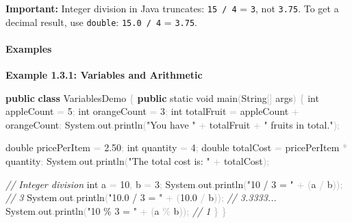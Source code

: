 \documentclass[
  justified,
  openright,
]{tufte-book}
\let\subsection\paragraph
\let\paragraph\paragraph
\newcommand{\KeywordTok}[1]{\textcolor{CodeKeyword}{\textbf{#1}}}  %
\newcommand{\StringTok}[1]{\textcolor{CodeString}{#1}}              %
\newcommand{\CommentTok}[1]{\textcolor{CodeComment}{\textit{#1}}}  %
\newcommand{\CodeNumTok}[1]{\textcolor{CodeNumber}{#1}}             %
\newcommand{\CodeFuncTok}[1]{\textcolor{CodeKeyword}{#1}}           %
\newcommand{\CodeTypeTok}[1]{\textcolor{CodeType}{#1}}              %
\newcommand{\OperatorTok}[1]{\textcolor{DarkGray}{#1}}              %
\newenvironment{Shaded}{%
  \begin{mdframed}[style=TufteCode]%
}{%
  \end{mdframed}%
}
\let\subsection\paragraph
\let\paragraph\paragraph
\begin{document}
\textbf{Important:} Integer division in Java truncates:
\texttt{15\ /\ 4} = \texttt{3}, not \texttt{3.75}. To get a decimal
result, use \texttt{double}: \texttt{15.0\ /\ 4} = \texttt{3.75}.

\subsection{Examples}\label{examples-21}

\textbf{Example 1.3.1: Variables and Arithmetic}

\begin{Shaded}
\begin{Highlighting}[]
\KeywordTok{public} \KeywordTok{class} VariablesDemo \OperatorTok{\{}
    \KeywordTok{public} \CodeTypeTok{static} \CodeTypeTok{void} \CodeFuncTok{main}\OperatorTok{(}String\OperatorTok{[]} args\OperatorTok{)} \OperatorTok{\{}
        \CodeTypeTok{int} appleCount \OperatorTok{=} \CodeNumTok{5}\OperatorTok{;}
        \CodeTypeTok{int} orangeCount \OperatorTok{=} \CodeNumTok{3}\OperatorTok{;}
        \CodeTypeTok{int} totalFruit \OperatorTok{=} appleCount \OperatorTok{+} orangeCount\OperatorTok{;}
        System\OperatorTok{.}\CodeFuncTok{out}\OperatorTok{.}\CodeFuncTok{println}\OperatorTok{(}\StringTok{"You have "} \OperatorTok{+} totalFruit \OperatorTok{+} \StringTok{" fruits in total."}\OperatorTok{);}
 
        \CodeTypeTok{double} pricePerItem \OperatorTok{=} \CodeNumTok{2.50}\OperatorTok{;}
        \CodeTypeTok{int} quantity \OperatorTok{=} \CodeNumTok{4}\OperatorTok{;}
        \CodeTypeTok{double} totalCost \OperatorTok{=} pricePerItem \OperatorTok{*} quantity\OperatorTok{;}
        System\OperatorTok{.}\CodeFuncTok{out}\OperatorTok{.}\CodeFuncTok{println}\OperatorTok{(}\StringTok{"The total cost is: "} \OperatorTok{+} totalCost\OperatorTok{);}
 
        \CommentTok{// Integer division}
        \CodeTypeTok{int} a \OperatorTok{=} \CodeNumTok{10}\OperatorTok{,} b \OperatorTok{=} \CodeNumTok{3}\OperatorTok{;}
        System\OperatorTok{.}\CodeFuncTok{out}\OperatorTok{.}\CodeFuncTok{println}\OperatorTok{(}\StringTok{"10 / 3 = "} \OperatorTok{+} \OperatorTok{(}a \OperatorTok{/} b\OperatorTok{));}       \CommentTok{// 3}
        System\OperatorTok{.}\CodeFuncTok{out}\OperatorTok{.}\CodeFuncTok{println}\OperatorTok{(}\StringTok{"10.0 / 3 = "} \OperatorTok{+} \OperatorTok{(}\CodeNumTok{10.0} \OperatorTok{/} b\OperatorTok{));}  \CommentTok{// 3.3333...}
        System\OperatorTok{.}\CodeFuncTok{out}\OperatorTok{.}\CodeFuncTok{println}\OperatorTok{(}\StringTok{"10 \% 3 = "} \OperatorTok{+} \OperatorTok{(}a \OperatorTok{\%} b\OperatorTok{));}        \CommentTok{// 1}
    \OperatorTok{\}}
\OperatorTok{\}}
\end{Highlighting}
\end{Shaded}
\end{document}
